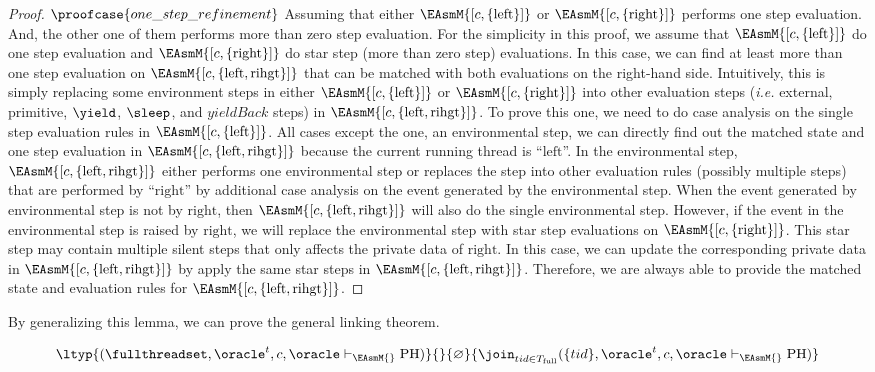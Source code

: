 \begin{proof}
$\proofcase{one\_step\_refinement}$
Assuming that either $\EAsmM{[c, \mathrm{\{left\}}]}$ or  $\EAsmM{[c, \mathrm{\{right\}}]}$  performs one step
evaluation. 
And, the other one of them performs more than zero step evaluation. 
For the simplicity in this proof, we assume that $\EAsmM{[c, \mathrm{\{left\}}]}$ do one step evaluation and $\EAsmM{[c, \mathrm{\{right\}}]}$ do  star step (more than zero step) evaluations.
In this case, we can find at least more than one step evaluation on $\EAsmM{[c, \mathrm{\{left, rihgt\}}]}$
that can be matched with both evaluations on the right-hand side. 
Intuitively, this is simply replacing some environment steps in either $\EAsmM{[c, \mathrm{\{left\}}]}$ or $\EAsmM{[c, \mathrm{\{right\}}]}$ into other evaluation steps 
(\textit{i.e.} external, primitive, $\yield$, $\sleep$, and $yieldBack$ steps) in $\EAsmM{[c, \mathrm{\{left, rihgt\}}]}$.
To prove this one, we need to do case analysis on the single step evaluation rules in $\EAsmM{[c, \mathrm{\{left\}}]}$.
All cases except the one, an environmental step, we can directly find out the matched state and one step evaluation in
$\EAsmM{[c, \mathrm{\{left, rihgt\}}]}$ because the current running thread is ``$\mathrm{left}$''. 
In the environmental step, $\EAsmM{[c, \mathrm{\{left, rihgt\}}]}$ either performs one environmental step or 
replaces the step into other evaluation rules (possibly multiple steps) that are performed by ``$\mathrm{right}$'' 
by additional case analysis on the event generated by the environmental step.
When the event generated by environmental step is not by $\mathrm{right}$, 
then $\EAsmM{[c, \mathrm{\{left, rihgt\}}]}$ will also do the single environmental step. 
However, if the event in the environmental step is raised by $\mathrm{right}$, we will replace the environmental step 
with star step evaluations on $\EAsmM{[c, \mathrm{\{right\}}]}$.
This star step may contain multiple silent steps that only affects the private data of $\mathrm{right}$.
In this case, we can update the corresponding private data in $\EAsmM{[c, \mathrm{\{left, rihgt\}}]}$ by apply the 
same star steps in $\EAsmM{[c, \mathrm{\{left, rihgt\}}]}$.
Therefore, we are always able to provide the matched state and evaluation rules for $\EAsmM{[c, \mathrm{\{left, rihgt\}}]}$.
\end{proof}

By generalizing this lemma, we can prove the general linking theorem. 
\begin{theorem}
\begin{small}
$$\ltyp{(\fullthreadset, \oracle^t, c, \oracle  \vdash_{\EAsmM{}} \mathrm{PH})}{}
{\varnothing}{\join_{tid \in T_{\mathrm{full}}} ( \{tid\}, \oracle^t, c, \oracle\vdash_{\EAsmM{}} \mathrm{PH})}$$
\end{small}
\label{theorem:thread-full-compose}
\end{theorem}

